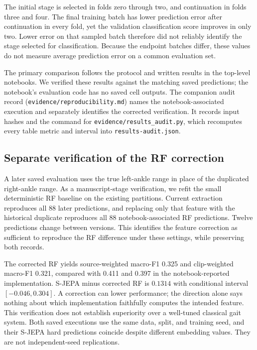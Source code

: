 \documentclass[10pt,twocolumn,letterpaper]{article}
\begin{document}
The initial stage is selected in folds zero through two, and continuation in folds three and four. The final training batch has lower prediction error after continuation in every fold, yet the validation classification score improves in only two. Lower error on that sampled batch therefore did not reliably identify the stage selected for classification. Because the endpoint batches differ, these values do not measure average prediction error on a common evaluation set.

The primary comparison follows the protocol and written results in the top-level notebooks. We verified these results against the matching saved predictions; the notebook's evaluation code has no saved cell outputs. The companion audit record (\texttt{evidence/reproducibility.md}) names the notebook-associated execution and separately identifies the corrected verification. It records input hashes and the command for \texttt{evidence/results\_audit.py}, which recomputes every table metric and interval into \texttt{results-audit.json}.

\subsection{Separate verification of the RF correction}
A later saved evaluation uses the true left-ankle range in place of the duplicated right-ankle range. As a manuscript-stage verification, we refit the small deterministic RF baseline on the existing partitions. Current extraction reproduces all 88 later predictions, and replacing only that feature with the historical duplicate reproduces all 88 notebook-associated RF predictions. Twelve predictions change between versions. This identifies the feature correction as sufficient to reproduce the RF difference under these settings, while preserving both records.

The corrected RF yields source-weighted macro-F1 0.325 and clip-weighted macro-F1 0.321, compared with 0.411 and 0.397 in the notebook-reported implementation. S-JEPA minus corrected RF is $0.1314$ with conditional interval $[-0.046,0.304]$. A correction can lower performance; the direction alone says nothing about which implementation faithfully computes the intended feature. This verification does not establish superiority over a well-tuned classical gait system. Both saved executions use the same data, split, and training seed, and their S-JEPA hard predictions coincide despite different embedding values. They are not independent-seed replications.
\end{document}
